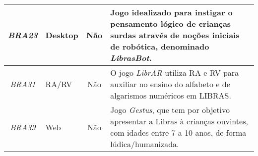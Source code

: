 \begin{small}
\begin{longtable}{|c|C{2.75cm}|c|L{10cm}|}
\textit{BRA23} & Desktop & Não & Jogo idealizado para instigar o pensamento lógico de crianças surdas através de noções iniciais de robótica, denominado \textit{LibrasBot}. \\ \hline
\textit{BRA31} & RA/RV & Não & O jogo \textit{LibrAR} utiliza RA e RV para auxiliar no ensino do alfabeto e de algarismos numéricos em LIBRAS. \\ \hline
\textit{BRA39} & Web & Não & Jogo \textit{Gestus}, que tem por objetivo apresentar a Libras à crianças ouvintes, com idades entre 7 a 10 anos, de forma lúdica/humanizada. \\ \hline

\end{longtable}
\end{small}
